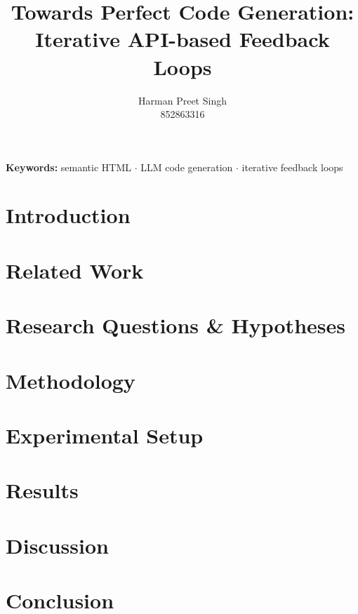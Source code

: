 \documentclass{article}
\title{Towards Perfect Code Generation: Iterative API-based Feedback Loops}
\author{%
Harman Preet Singh \\[0.5em] 852863316 \\
}
\providecommand{\keywords}[1]
{
	\small
	\textbf{Keywords: } #1
}
\begin{document}
\maketitle




\keywords{
	semantic HTML
	$\cdot$ LLM code generation
	$\cdot$ iterative feedback loops
}


\section{Introduction}
\label{sec:introduction}


\section{Related Work}
\label{sec:related-work}


\section{Research Questions \& Hypotheses}
\label{sec:research-questions}


\section{Methodology}
\label{sec:methodology}


\section{Experimental Setup}
\label{sec:experimental-setup}


\section{Results}
\label{sec:results}


\section{Discussion}
\label{sec:discussion}


\section{Conclusion}
\label{sec:conclusion}




% 
\newpage


\newpage

\end{document}
